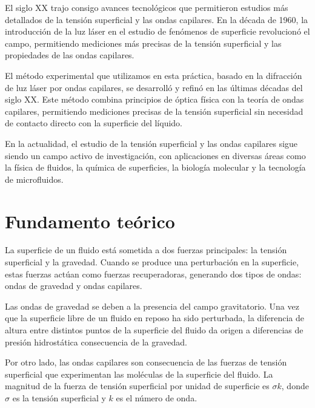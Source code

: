 El siglo XX trajo consigo avances tecnológicos que permitieron estudios más detallados de la tensión superficial y las ondas capilares. En la década de 1960, la introducción de la luz láser en el estudio de fenómenos de superficie revolucionó el campo, permitiendo mediciones más precisas de la tensión superficial y las propiedades de las ondas capilares.

\vspace{\baselineskip}

El método experimental que utilizamos en esta práctica, basado en la difracción de luz láser por ondas capilares, se desarrolló y refinó en las últimas décadas del siglo XX. Este método combina principios de óptica física con la teoría de ondas capilares, permitiendo mediciones precisas de la tensión superficial sin necesidad de contacto directo con la superficie del líquido.

\vspace{\baselineskip}

En la actualidad, el estudio de la tensión superficial y las ondas capilares sigue siendo un campo activo de investigación, con aplicaciones en diversas áreas como la física de fluidos, la química de superficies, la biología molecular y la tecnología de microfluidos.


\section{Fundamento teórico}


La superficie de un fluido está sometida a dos fuerzas principales: la tensión superficial y la gravedad. Cuando se produce una perturbación en la superficie, estas fuerzas actúan como fuerzas recuperadoras, generando dos tipos de ondas: ondas de gravedad y ondas capilares.

\vspace{\baselineskip}

Las ondas de gravedad se deben a la presencia del campo gravitatorio. Una vez que la superficie libre de un fluido en reposo ha sido perturbada, la diferencia de altura entre distintos puntos de la superficie del fluido da origen a diferencias de presión hidrostática consecuencia de la gravedad.

\vspace{\baselineskip}

Por otro lado, las ondas capilares son consecuencia de las fuerzas de tensión superficial que experimentan las moléculas de la superficie del fluido. La magnitud de la fuerza de tensión superficial por unidad de superficie es $\sigma k$, donde $\sigma$ es la tensión superficial y $k$ es el número de onda.

